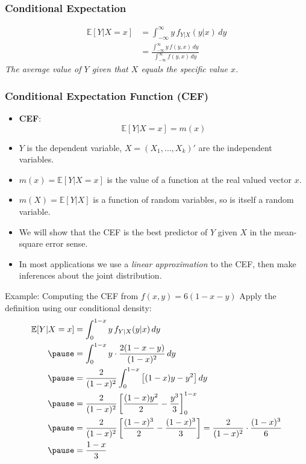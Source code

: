 \documentclass[aspectratio=169, handout, t]{beamer}
\numberwithin{equation}{section}
\begin{document}
\begin{frame}
\frametitle{Conditional Expectation}
\begin{align*}
\mathbb{E}[Y|X=x]&=\int_{-\infty}^{\infty} y\, f_{Y|X}(y|x)\,dy\\
&=\frac{\int_{-\infty}^{\infty} y\, f(y,x)\,dy}{\int_{-\infty}^{\infty} f(y,x)\,dy}
\end{align*}
\smallskip
\emph{The average value of $Y$ given that $X$ equals the specific value $x$.}
\end{frame}

\begin{frame}
\frametitle{Conditional Expectation Function (CEF)}
\begin{itemize}
\item \textbf{CEF}:
$$\mathbb{E}[Y|X=x]=m(x)$$
\item $Y$ is the dependent variable, $X=(X_1,\ldots, X_k)'$ are the independent variables.
\item $m(x)=\mathbb{E}[Y|X=x]$ is the value of a function at the real valued vector $x$.
\item $m(X)=\mathbb{E}[Y|X]$ is a function of random variables, so is itself a random variable.
\item We will show that the CEF is the best predictor of $Y$ given $X$ in the mean-square error sense.
\item In most applications we use a \emph{linear approximation} to the CEF, then make inferences about the joint distribution.
\end{itemize}
\end{frame}


\begin{frame}{Example: Computing the CEF from $f(x,y)=6(1-x-y)$}
\small
Apply the definition using our conditional density:
\begin{align*}
\mathbb{E}[Y|X=x]&=\int_0^{1-x} y\, f_{Y|X}(y|x)\,dy\\\pause
&=\int_0^{1-x} y\cdot\frac{2(1-x-y)}{(1-x)^2}\,dy\\\pause
&=\frac{2}{(1-x)^2}\int_0^{1-x} \left[(1-x)y-y^2\right]dy\\\pause
&=\frac{2}{(1-x)^2}\left[\frac{(1-x)y^2}{2}-\frac{y^3}{3}\right]_0^{1-x}\\\pause
&=\frac{2}{(1-x)^2}\left[\frac{(1-x)^3}{2}-\frac{(1-x)^3}{3}\right]
=\frac{2}{(1-x)^2}\cdot\frac{(1-x)^3}{6}\\\pause
&=\frac{1-x}{3}
\end{align*}
\end{frame}
\end{document}
